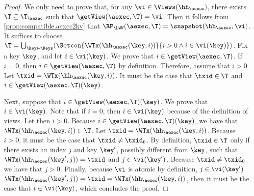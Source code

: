 \begin{proof}
We only need to prove that, for any $\vi \in \Views(\hh_{\aexec})$, there exists $\T \subseteq \T_{\aexec}$ such 
that $\getView(\aexec, \T) = \vi$. Then it follows from \cref{prop:compatible.aexec2kv} that 
$\RP_{\LWW}(\aexec, \T) = \snapshot(\hh_{\aexec}, \vi)$. 
It suffices to choose $\T = \bigcup_{\key \in \Keys}(\Setcon{ \WTx(\hh_{\aexec}(\key, i)) }{ i > 0 
\wedge i \in \vi(\key)})$.
Fix a key $\key$, and let $i \in \vi(\key)$. We prove that $i \in \getView(\aexec, \T)$. 
If $i = 0$, then $i \in \getView(\aexec, \T)$ by definition. 
Therefore, assume that $i > 0$. Let $\txid = \WTx(\hh_{\aexec}(\key, i))$.
It must be the case that $\txid \in \T$ and $i \in \getView(\aexec, \T)(\key)$.

Next, suppose that $i \in \getView(\aexec, \T)(\key)$. We prove that $i \in \vi(\key)$.
Note that if $i = 0$, then $i \in \vi(\key)$ because of the 
definition of views. Let then $i > 0$. Because $i \in \getView(\aexec, \T)(\key)$, we have that 
$\WTx(\hh_{\aexec}(\key, i)) \in \T$.  Let $\txid = \WTx(\hh_{\aexec}(\key, i))$. Because $i > 0$, 
it must be the case that $\txid \neq \txid_0$.
By definition, $\txid \in \T$ only if there 
exists an index $j$ and key $\key'$, possibly different from $\key$, such that $\WTx(\hh_{\aexec}(\key', j)) = \txid$ and $j \in \vi(\key')$. 
Because $\txid \neq \txid_0$ we have that $j > 0$. Finally, because $\vi$ is atomic by definition, $j \in \vi(\key')$
$\WTx(\hh_{\aexec}(\key', j)) = \txid = \WTx(\hh_{\aexec}(\key, i))$, then it must be the case 
that $i \in \vi(\key)$, which concludes the proof.
\end{proof}

